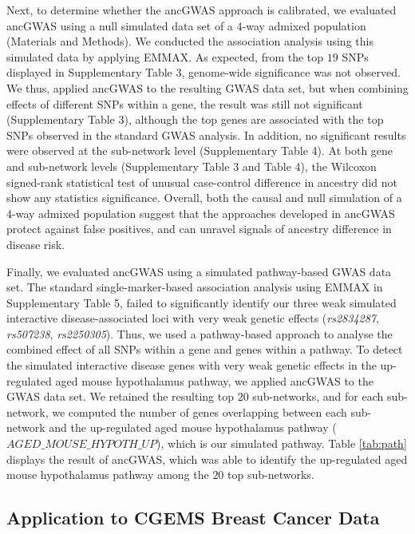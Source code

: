 \documentclass[10pt]{article}
\begin{document}
Next, to determine whether the ancGWAS approach is calibrated, we evaluated ancGWAS using a null simulated data set of a $4$-way admixed population (Materials and Methods). We conducted the association analysis using this simulated data by applying EMMAX. As expected, from the top $19$ SNPs displayed in Supplementary Table 3, genome-wide significance was not observed. We thus, applied ancGWAS to the resulting GWAS data set, but when combining effects of different SNPs within a gene, the result was still not significant (Supplementary Table 3), although the top genes are associated with the top SNPs observed in the standard GWAS analysis. In addition, no significant results were observed at the sub-network level (Supplementary Table 4). At both gene and sub-network levels (Supplementary Table 3 and Table 4), the Wilcoxon signed-rank statistical test of unusual case-control difference in ancestry did not show any statistics significance. Overall, both the causal and null simulation of a 4-way admixed population suggest that the approaches developed in ancGWAS protect against false positives, and can unravel signals of ancestry difference in disease risk. 

Finally, we evaluated ancGWAS using a simulated pathway-based GWAS data set. The standard single-marker-based association analysis using EMMAX in Supplementary Table 5, failed to significantly identify our three weak simulated interactive disease-associated loci with very weak genetic effects  (\textit{rs2834287}, \textit{rs507238}, \textit{rs2250305}). Thus, we used a pathway-based approach to analyse the combined effect of all SNPs within a gene and genes within a pathway. To detect the simulated interactive disease genes with very weak genetic effects in the up-regulated aged mouse hypothalamus pathway, we applied ancGWAS to the GWAS data set. We retained the resulting top $20$ sub-networks, and for each sub-network, we computed the number of genes overlapping between each sub-network and the up-regulated aged mouse hypothalamus pathway ($AGED\_MOUSE\_HYPOTH\_UP$), which is our simulated pathway. Table \ref{tab:path} displays the result of ancGWAS, which was able to identify the up-regulated aged mouse hypothalamus pathway among the $20$ top sub-networks.


\subsection*{Application to CGEMS Breast Cancer Data}
\label{ancPathc}
\end{document}
